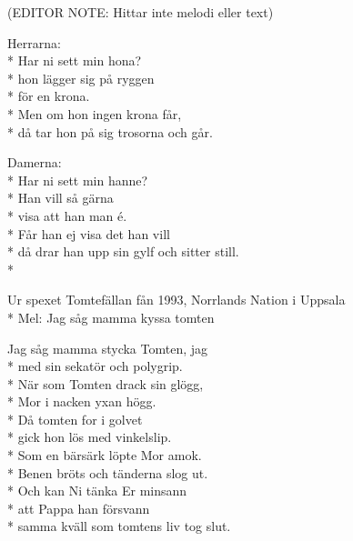 \begin{SongText}
    \begin{SongInfo}
        (EDITOR NOTE: Hittar inte melodi eller text)
    \end{SongInfo}
    \begin{SongVerse}
        Herrarna:\\*%
        Har ni sett min hona?\\*%
        hon lägger sig på ryggen\\*%
        för en krona.\\*%
        Men om hon ingen krona får,\\*%
        då tar hon på sig trosorna och går.
    \end{SongVerse}
    \begin{SongVerse}
        Damerna:\\*%
        Har ni sett min hanne?\\*%
        Han vill så gärna\\*%
        visa att han man é.\\*%
        Får han ej visa det han vill\\*%
        då drar han upp sin gylf och sitter still. \\*%
    \end{SongVerse}
\end{SongText}
\begin{SongText}[Julvisa]
    \begin{SongInfo}
        Ur spexet Tomtefällan fån 1993, Norrlands Nation i Uppsala\\*%
        Mel: Jag såg mamma kyssa tomten
    \end{SongInfo}
    \begin{SongVerse}
        Jag såg mamma stycka Tomten, jag\\*%
        med sin sekatör och polygrip.\\*%
        När som Tomten drack sin glögg,\\*%
        Mor i nacken yxan högg.\\*%
        Då tomten for i golvet\\*%
        gick hon lös med vinkelslip.\\*%
        Som en bärsärk löpte Mor amok.\\*%
        Benen bröts och tänderna slog ut.\\*%
        Och kan Ni tänka Er minsann\\*%
        att Pappa han försvann\\*%
        samma kväll som tomtens liv tog slut.
    \end{SongVerse}
\end{SongText}
